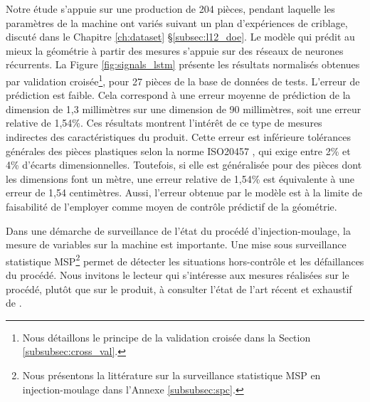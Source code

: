 Notre étude  s'appuie sur une production de 204 pièces, pendant laquelle les paramètres de la machine ont variés suivant un plan d'expériences de criblage, discuté dans le Chapitre \ref{ch:dataset} §\ref{subsec:l12_doe}.
Le modèle qui prédit au mieux la géométrie à partir des mesures s'appuie sur des réseaux de neurones récurrents. %
La Figure \ref{fig:signals_lstm} présente les résultats normalisés obtenues par validation croisée\footnote{Nous détaillons le principe de la validation croisée dans la Section \ref{subsubsec:cross_val}.}, pour 27 pièces de la base de données de tests.
L'erreur de prédiction est faible.
Cela correspond à une erreur moyenne de prédiction de la dimension de 1,3 millimètres sur une dimension de 90 millimètres, soit une erreur relative de 1,54\%.
Ces résultats montrent l'intérêt de ce type de mesures indirectes des caractéristiques du produit.
Cette erreur est inférieure tolérances générales des pièces plastiques selon la norme ISO20457 \cite{ISO_20457_2018}, qui exige entre 2\% et 4\% d'écarts dimensionnelles.
Toutefois, si elle est généralisée pour des pièces dont les dimensions font un mètre, une erreur relative de 1,54\% est équivalente à une erreur de 1,54 centimètres.
Aussi, l'erreur obtenue par le modèle est à la limite de faisabilité de l'employer comme moyen de contrôle prédictif de la géométrie.

Dans une démarche de surveillance de l'état du procédé d'injection-moulage, la mesure de variables sur la machine est importante.
Une mise sous surveillance statistique MSP\footnote{Nous présentons la littérature sur la surveillance statistique MSP en injection-moulage dans l'Annexe \ref{subsubsec:spc}.} permet de détecter les situations hors-contrôle et les défaillances du procédé.
Nous invitons le lecteur qui s'intéresse aux mesures réalisées sur le procédé, plutôt que sur le produit, à consulter l'état de l'art récent et exhaustif de \citeauthor{ageyeva_inmold_2019} \cite{ageyeva_inmold_2019}.


